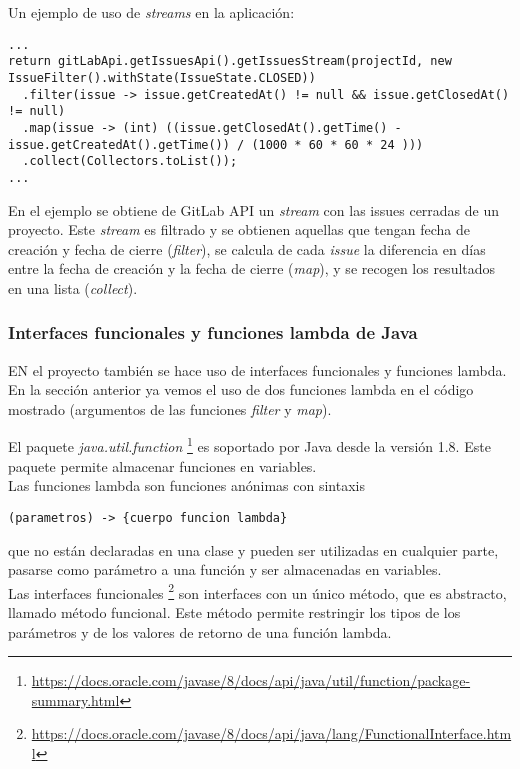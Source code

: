 Un ejemplo de uso de \textit{streams} en la aplicación:\\
\begin{minipage}{\linewidth}
{\tiny
\begin{verbatim}
...
return gitLabApi.getIssuesApi().getIssuesStream(projectId, new IssueFilter().withState(IssueState.CLOSED))
  .filter(issue -> issue.getCreatedAt() != null && issue.getClosedAt() != null)
  .map(issue -> (int) ((issue.getClosedAt().getTime() - issue.getCreatedAt().getTime()) / (1000 * 60 * 60 * 24 )))
  .collect(Collectors.toList());
...
\end{verbatim}
}
\end{minipage}

En el ejemplo se obtiene de GitLab API un \textit{stream} con las issues cerradas de un proyecto. Este \textit{stream} es filtrado y se obtienen aquellas que tengan fecha de creación y fecha de cierre (\textit{filter}), se calcula de cada \textit{issue} la diferencia en días entre la fecha de creación y la fecha de cierre (\textit{map}), y se recogen los resultados en una lista (\textit{collect}).


\subsubsection{Interfaces funcionales y funciones lambda de Java}

EN el proyecto también se hace uso de interfaces funcionales y funciones lambda. En la sección anterior ya vemos el uso de dos funciones lambda en el código mostrado (argumentos de las funciones \textit{filter} y \textit{map}).

El paquete \textit{java.util.function} \footnote{\url{https://docs.oracle.com/javase/8/docs/api/java/util/function/package-summary.html}} es soportado por Java desde la versión 1.8. Este paquete permite almacenar funciones en variables. 
\\Las funciones lambda son funciones anónimas con sintaxis \\
\begin{minipage}{\linewidth}
{\tiny
\begin{verbatim}
(parametros) -> {cuerpo funcion lambda}
\end{verbatim}
}
\end{minipage}
que no están declaradas en una clase y pueden ser utilizadas en cualquier parte, pasarse como parámetro a una función y ser almacenadas en variables.
\\Las interfaces funcionales \footnote{\url{https://docs.oracle.com/javase/8/docs/api/java/lang/FunctionalInterface.html}} son interfaces con un único método, que es abstracto, llamado método funcional. Este método permite restringir los tipos de los parámetros y de los valores de retorno de una función lambda.

